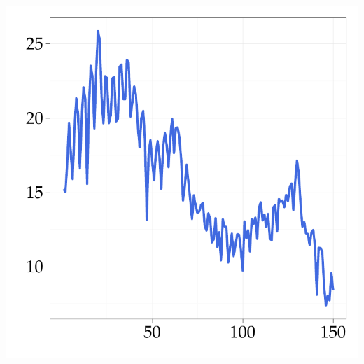 \documentclass[xcolor=dvipsnames, compress, serif, professionalfont, handout]{beamer}
\newenvironment{knitrout}{}{} %
\renewenvironment{knitrout}{\begin{footnotesize}}{\end{footnotesize}}
\begin{document}
\begin{frame}[fragile]
\begin{minipage}{0.48\textwidth}
\begin{knitrout}
{\centering \includegraphics[width=\linewidth,height=\linewidth]{figure/graphics-GR_speech} 

}


\end{knitrout}

  \end{minipage}
\end{frame}

%
%
%
\end{document}
